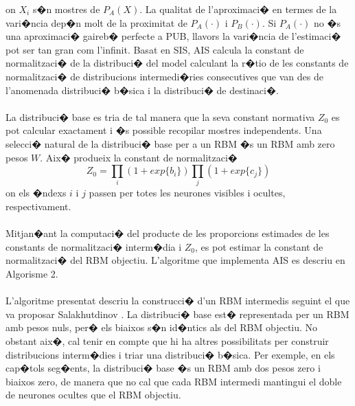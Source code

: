 \documentclass[12pt,a4paper,openright,oneside]{article}
\numberwithin{equation}{section}
\theoremstyle{definition}
\begin{document}
on ${X_i}$ s�n mostres de ${P_A(X)}$. La qualitat de l'aproximaci� en termes de la vari�ncia dep�n molt de la proximitat de ${P_A( \cdot )}$ i ${P_B( \cdot )}$. Si ${P_A( \cdot )}$ no �s una aproximaci� gaireb� perfecte a PUB, llavors la vari�ncia de l'estimaci� pot ser tan gran com l'infinit. Basat en SIS, AIS calcula la constant de normalitzaci� de la distribuci� del model calculant la r�tio de les constants de normalitzaci� de distribucions intermedi�ries consecutives que van des de l'anomenada distribuci� b�sica i la distribuci� de destinaci�. \\\\
La distribuci� base es tria de tal manera que la seva constant normativa ${Z_0}$ es pot calcular exactament i �s possible recopilar mostres independents. Una selecci� natural de la distribuci� base per a un RBM �s un RBM amb zero pesos ${W}$. Aix� produeix la constant de normalitzaci�
\begin{equation}
Z_0 = \prod_i (1 + exp \{b_i\}) \prod_j (1 + exp \{c_j\})
\end{equation}
on els �ndexs ${i}$ i ${j}$ passen per totes les neurones visibles i ocultes, respectivament.\\\\
Mitjan�ant la computaci� del producte de les proporcions estimades de les constants de normalitzaci� interm�dia i ${Z_0}$, es pot estimar la constant de normalitzaci� del RBM objectiu. L'algoritme que implementa AIS es descriu en Algorisme 2.\\\\
L'algoritme presentat descriu la construcci� d'un RBM intermedis seguint el que va proposar Salakhutdinov \cite{salakhutdinov}. La distribuci� base est� representada per un RBM amb pesos nuls, per� els biaixos s�n id�ntics als del RBM objectiu. No obstant aix�, cal tenir en compte que hi ha altres possibilitats per construir distribucions interm�dies i triar una distribuci� b�sica. Per exemple, en els cap�tols seg�ents, la distribuci� base �s un RBM amb dos pesos zero i biaixos zero, de manera que no cal que cada RBM intermedi mantingui el doble de neurones ocultes que el RBM objectiu.
\end{document}

